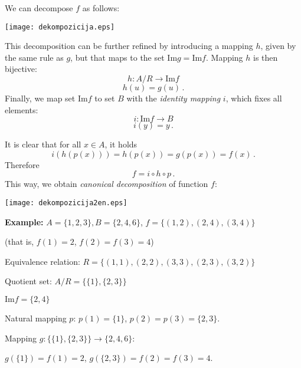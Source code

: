 \documentclass[11pt,paper=b5,footinclude,headinclude]{scrbook} %
\def\cee {{~\Leftrightarrow~}}
\theoremstyle{remark}
\theoremstyle{definition} %
\theoremstyle{theorem} %
\begin{document}
We can decompose $f$ as follows:
\begin{center}
\texttt{[image: dekompozicija.eps]}
\end{center}

%
%
This decomposition can be further refined by
introducing a mapping $h$, given by the same rule as $g$, but that maps to the set $\textrm{Im}g = \textrm{Im}f$.
Mapping $h$ is then bijective:
$$h:A/R{\to} \textrm{Im}f$$
$$h(u) = g(u)\,.$$
Finally, we map set $\textrm{Im}f$ to set $B$ with the  {\em identity mapping} $i$, which fixes all elements:
$$i:\textrm{Im}f{\to}B$$
$$i(y) = y\,.$$

It is clear that for all $x\in A$, it holds
$$i(h(p(x))) = h(p(x)) = g(p(x)) = f(x)\,.$$
Therefore
$$f = i\circ h\circ p\,.$$
This way, we obtain {\em canonical decomposition} of function $f$:
\begin{center}
\texttt{[image: dekompozicija2en.eps]}
\end{center}

\textbf{ Example:}
$A = \{1,2,3\}, B = \{2,4,6\}$,
$f = \{(1,2),(2,4),(3,4)\}$

(that is, $f(1) = 2$, $f(2)= f(3) = 4$)

Equivalence relation: $R = \{(1,1),(2,2),(3,3),(2,3),(3,2)\}$

Quotient set: $A/R = \{\{1\},\{2,3\}\}$

$\textrm{Im} f = \{2,4\}$

Natural mapping $p$: $p(1) = \{1\}$, $p(2) = p(3) = \{2,3\}$.

Mapping $g: \{\{1\},\{2,3\}\}\to \{2,4,6\}$:

$g(\{1\}) = f(1) = 2$, $g(\{2,3\}) = f(2) = f(3) = 4$.
\end{document}
